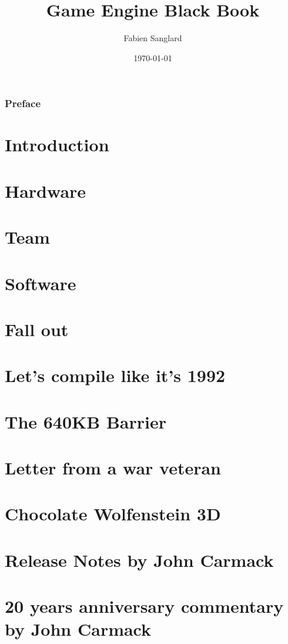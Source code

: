 \documentclass[10pt]{book}
\begin{document}
    \title{Game Engine Black Book}
    \author{Fabien Sanglard}
    \date{\today }
    \maketitle
    \tableofcontents
    \listoffigures
    \listoftables
    
    \pagebreak
    \subsection*{Preface}
      

    \chapter{Introduction}
    \chapter{Hardware}
      
    \chapter{Team}
      
    \chapter{Software}
       
    \chapter{Fall out}

    \appendix
    \appendixpage

    \chapter{Let's compile like it's 1992}
    \chapter{The 640KB Barrier}
    \chapter{Letter from a war veteran}
    \chapter{Chocolate Wolfenstein 3D}
    \chapter{Release Notes by John Carmack}
    \chapter{20 years anniversary commentary by John Carmack}
\end{document}
